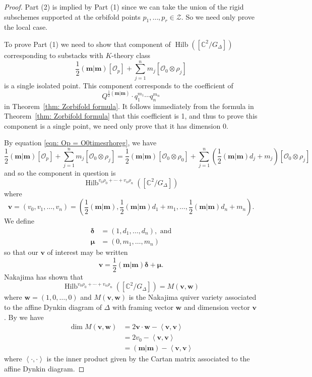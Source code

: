 \documentclass{amsart}
\theoremstyle{definition}
\newcommand{\half}{\frac{1}{2}}
\newcommand{\CC} {{\mathbb C}}          %
\renewcommand{\O}{\mathcal{O}}
\newcommand{\mvec}{\bm{m}}
\newcommand{\deltavec}{\bm{\delta  }}
\newcommand{\muvec}{\bm{\mu  }}
\newcommand{\vvec}{\bm{v }}
\newcommand{\wvec}{\bm{w }}
\newcommand{\Hilb}{\operatorname{Hilb}}
\begin{document}
\begin{proof}
	Part (2) is implied by Part (1) since we can take the union of the rigid subschemes supported at the orbifold points $p_1,\dots,p_r \in \mathcal{Z}$. So we need only prove the local case.
	
To prove Part (1) we need to show that component of $\Hilb
([\CC^{2}/G_{\Delta}])$ corresponding to substacks with $K$-theory
class
\[
\half (\mvec|\mvec)[\O_{p}] + \sum_{j=1}^{n}
m_{j}[\O_{0}\otimes \rho_{j}]
\]
is a single isolated point. This component corresponds to the
coefficient of 
\[
Q^{\half(\mvec |\mvec )}\cdot  q_{1}^{m_{1}}\dotsb q_{n}^{m_{n}}
\]
in Theorem~\ref{thm: Zorbifold formula}. It follows immediately from
the formula in Theorem~\ref{thm: Zorbifold formula} that this
coefficient is 1, and thus to prove this component is a single point,
we need only prove that it has dimension 0.

By equation \eqref{eqn: Op
= O0timesrhoreg}, we have
\[
\half (\mvec|\mvec)[\O_{p}] + \sum_{j=1}^{n}
m_{j}[\O_{0}\otimes \rho_{j}] = 
\half (\mvec|\mvec)[\O_{0}\otimes \rho_{0}] + \sum_{j=1}^{n}
\left(\half (\mvec |\mvec )d_{j}+m_{j} \right)[\O_{0}\otimes \rho_{j}]
\]
and so the component in question is 
\[
\Hilb^{v_{0}\rho_{0}+\dotsb +v_{n}\rho_{n}}([\CC^{2} /G_{\Delta}])
\]
where
\[
\vvec =(v_{0},v_{1},\dotsc ,v_{n}) = \left(\half (\mvec |\mvec ),\half (\mvec |\mvec )d_{1}+m_{1},\dotsc ,\half (\mvec |\mvec )d_{n}+m_{n} \right).
\]
We define
\begin{align*}
\deltavec& = (1,d_{1},\dotsc ,d_{n}),\text{ and}\\
\muvec &= (0,m_{1},\dotsc ,m_{n})
\end{align*}
so that our $\vvec$ of interest may be written
\[
\vvec =\half (\mvec |\mvec )\deltavec +\muvec .
\]
Nakajima has shown \cite[\S~2]{nakajima2002geometric} that 
\[
\Hilb^{v_{0}\rho_{0}+\dotsb +v_{n}\rho_{n}}([\CC^{2} /G_{\Delta}]) = M(\vvec ,\wvec )
\]
where $\wvec = (1,0,\dotsc ,0)$ and $M(\vvec ,\wvec )$ is the Nakajima
quiver variety associated to the affine Dynkin diagram of $\Delta$
with framing vector $\wvec$ and dimension vector $\vvec$. By
\cite[(2.6)]{Nakajima1994Duke} we have 
\begin{align*}
\dim M(\vvec ,\wvec )& = 2\vvec \cdot \wvec -\left\langle \vvec ,\vvec \right\rangle\\
&= 2v_{0} - \left\langle \vvec ,\vvec \right\rangle\\
&=(\mvec |\mvec ) - \left\langle \vvec ,\vvec\right\rangle
\end{align*}
where $\left\langle \cdot , \cdot  \right\rangle$ is the inner product
given by the Cartan matrix associated to the affine Dynkin diagram.


\end{proof}
\end{document}
